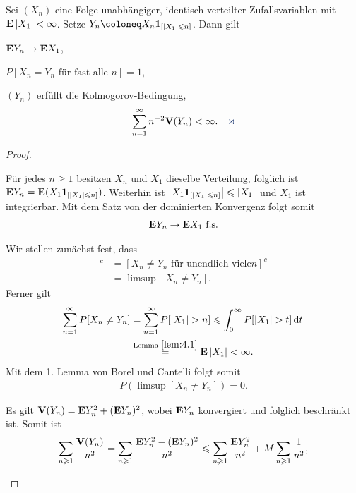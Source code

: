 \begin{lemn}[Stutzungslemma]
Sei $(X_n)$ eine Folge unabhängiger, identisch verteilter Zufallsvariablen mit
$\textbf{E} \left|X_1\right|< \infty$. Setze $Y_n \defl X_n\Id_{[\abs{X_1}\le n]}$. Dann gilt
\begin{propenum}
\item $\textbf{E} Y_n\to \textbf{E} X_1$,
\item $P[X_n = Y_n\text{ für fast alle }n]=1$,
\item $(Y_n)$ erfüllt die Kolmogorov-Bedingung,
\begin{align*}
\sum_{n=1}^\infty n^{-2} \V(Y_n) < \infty.\fishhere
\end{align*}
\end{propenum}
\end{lemn}
\begin{proof}
\begin{proofenum}
\item Für jedes $n\ge 1$ besitzen $X_n$ und $X_1$ dieselbe Verteilung, folglich
ist $\textbf{E} Y_n = \textbf{E} (X_1\mathbf{1}_{[\left|X_1\right|\leqslant n]})$. Weiterhin ist
$\left|X_1\mathbf{1}_{[\left|X_1\right|\leqslant n]}\right|\leqslant \left|X_1\right|$ und $X_1$ ist integrierbar. Mit
dem Satz von der dominierten Konvergenz folgt somit
\begin{align*}
\textbf{E} Y_n \to \textbf{E} X_1\ \text{f.s.}
\end{align*}
\item Wir stellen zunächst fest, dass
\begin{align*}
[X_n = Y_n\text{ für fast alle
}n]^c &= [X_n \neq Y_n\text{ für unendlich viele
}n]^c\\ &= \limsup [X_n\neq Y_n].
\end{align*}
Ferner gilt
\begin{align*}
\sum_{n=1}^\infty P[X_n\neq Y_n] &= \sum_{n=1}^\infty P[\abs{X_1} >n] \le
\int_0^\infty P[\abs{X_1}>t]\dt\\
&\overset{\text{Lemma }\ref{lem:4.1}}= \E\abs{X_1} < \infty.
\end{align*}
Mit dem 1. Lemma von Borel und Cantelli folgt somit
\begin{align*}
P(\limsup [X_n\neq Y_n]) = 0.
\end{align*}
\item Es gilt $\textbf{V}(Y_n) = \textbf{E} Y_n^2 + (\textbf{E} Y_n)^2$, wobei $\textbf{E} Y_n$ konvergiert und
folglich beschränkt ist. Somit ist
\begin{align*}
\sum_{n\geqslant 1} \frac{\textbf{V}(Y_n)}{n^2}
=
\sum_{n\geqslant 1} \frac{\textbf{E} Y_n^2 - (\textbf{E} Y_n)^2}{n^2}
\leqslant
\sum_{n\geqslant 1} \frac{\textbf{E} Y_n^2}{n^2} + M \sum_{n\geqslant 1}\frac{1}{n^2},   
\end{align*}

\end{proofenum}
\end{proof}
